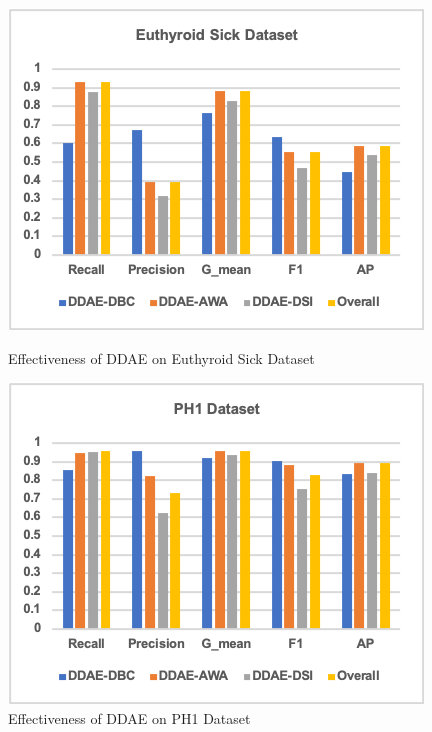 \begin{figure}[h]
    \centering 
    \begin{minipage}{0.45\textwidth}
        \includegraphics[width=\textwidth]{images/fig28}
        \caption{Effectiveness of DDAE on Euthyroid Sick Dataset}
        \label{fig28}
    \end{minipage}
    \quad
    \begin{minipage}{0.45\textwidth}
        \includegraphics[width=\textwidth]{images/fig29}
        \caption{Effectiveness of DDAE on PH1 Dataset}
        \label{fig29}
    \end{minipage}
\end{figure}

